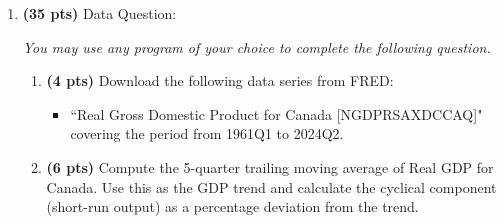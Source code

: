\documentclass[addpoints,12pt,answers]{exam}
\begin{document}
\begin{enumerate}[label=\textbf{\arabic*.}, itemsep=15pt]
\begin{enumerate}[label=(\alph*)]
			
			\item \textbf{(2 pts)} In the long run, will the price level be higher or lower? What about the output?

	\end{enumerate}
	
	\clearpage
	\textbf{Solution}
	\begin{enumerate}[label=(\alph*)]
		\item 	
		$M_t$ is controled by the central and is exgenously given 
		
		$V_t$ is constant in the long run
		
		$Y_t$ does not affected by the money market and is determined by only the real variables, according to the classical dichotomy 
		
		Thus, $P_t$ is determined by the $M_t$ only
		
		\item 
		\[g_m + g_V = g_P + g_Y\]
		Let $g_V = 0$ as it is usually assume to be a constant. Therefore,
		\[g_P = \pi = g_m - g_Y\]
		
		\item The inflation rate would slowly decrease. In the long run, the inflation would be lower.
		
		
		\item The price level would be higher than before, even though inflation is lower, as prices would still rise but at a slower rate. Output, however, would remain unchanged, as it is determined by factors unrelated to nominal variables.
		\vspace{1cm}
		
		
	\end{enumerate}
	
	\clearpage
	\item \textbf{(35 pts)} Data Question: 
	
	\textit{You may use any program of your choice to complete the following question.}
	
	\begin{enumerate}[label=(\alph*)]
		\item \textbf{(4 pts)} Download the following data series from FRED:  
		\begin{itemize}
			\item ``Real Gross Domestic Product for Canada [NGDPRSAXDCCAQ]" covering the period from 1961Q1 to 2024Q2.
		\end{itemize}
		
		\item \textbf{(6 pts)} Compute the 5-quarter trailing moving average of Real GDP for Canada. Use this as the GDP trend and calculate the cyclical component (short-run output) as a percentage deviation from the trend.
		

\end{enumerate}
\end{enumerate}
\end{document}
